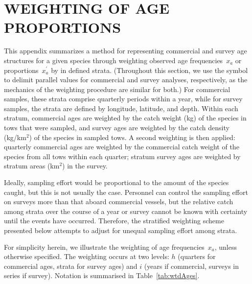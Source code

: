 \clearpage

\chapter{WEIGHTING OF AGE PROPORTIONS}
\label{chap:agecompweight}

This appendix summarizes a method for representing commercial and survey age structures for a given species through weighting observed age frequencies~$x_a$ or proportions~$x^\prime_a$ by  in defined strata. 
(Throughout this section, we use the symbol \sQuote{$\Vert$} to delimit parallel values for commercial and survey analyses, respectively, as the mechanics of the weighting procedure are similar for both.) 
For commercial samples, these strata comprise quarterly periods within a year, while for survey samples, the strata are defined by longitude, latitude, and depth. 
Within each stratum, commercial ages are weighted by the catch weight (kg) of the species in tows that were sampled, and survey ages are weighted by the catch density (kg/km$^2$) of the species in sampled tows. 
A second weighting is then applied: quarterly commercial ages are weighted by the commercial catch weight of the species from all tows within each quarter; stratum survey ages are weighted by stratum areas (km$^2$) in the survey. 

Ideally, sampling effort would be proportional to the amount of the species caught, but this is not usually the case. 
Personnel can control the sampling effort on surveys more than that aboard commercial vessels, but the relative catch among strata over the course of a year or survey cannot be known with certainty until the events have occurred. 
Therefore, the stratified weighting scheme presented below attempts to adjust for unequal sampling effort among strata.

For simplicity herein, we illustrate the weighting of age frequencies~$x_a$, unless otherwise specified. 
The weighting occurs at two levels: $h$ (quarters for commercial ages, strata for survey ages) and $i$ (years if commercial, surveys in series if survey). 
Notation is summarised in Table~\ref{tab:wtdAges}.

